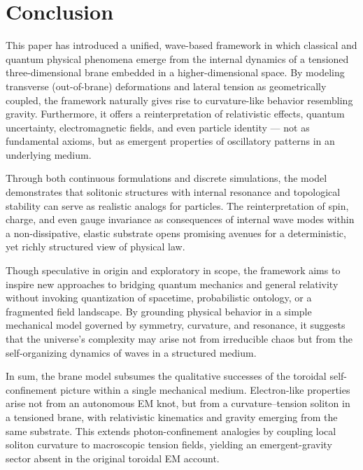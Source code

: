 \section{Conclusion}\label{conclusion}

This paper has introduced a unified, wave-based framework in which
classical and quantum physical phenomena emerge from the internal
dynamics of a tensioned three-dimensional brane embedded in a
higher-dimensional space. By modeling transverse (out-of-brane) deformations and lateral
tension as geometrically coupled, the framework naturally gives rise to
curvature-like behavior resembling gravity. Furthermore, it offers a
reinterpretation of relativistic effects, quantum uncertainty,
electromagnetic fields, and even particle identity --- not as
fundamental axioms, but as emergent properties of oscillatory patterns
in an underlying medium.

Through both continuous formulations and discrete simulations, the model
demonstrates that solitonic structures with internal resonance and
topological stability can serve as realistic analogs for particles. The
reinterpretation of spin, charge, and even gauge invariance as
consequences of internal wave modes within a non-dissipative, elastic
substrate opens promising avenues for a deterministic, yet richly
structured view of physical law.

Though speculative in origin and exploratory in scope, the framework
aims to inspire new approaches to bridging quantum mechanics and general
relativity without invoking quantization of spacetime, probabilistic
ontology, or a fragmented field landscape. By grounding physical
behavior in a simple mechanical model governed by symmetry, curvature,
and resonance, it suggests that the universe's complexity may arise not
from irreducible chaos but from the self-organizing dynamics of waves in
a structured medium.

In sum, the brane model subsumes the qualitative successes of the toroidal self-confinement
picture within a single mechanical medium. Electron-like properties arise not from an autonomous
EM knot, but from a curvature–tension soliton in a tensioned brane, with relativistic kinematics
and gravity emerging from the same substrate. This extends photon-confinement analogies by
coupling local soliton curvature to macroscopic tension fields, yielding an emergent-gravity
sector absent in the original toroidal EM account.